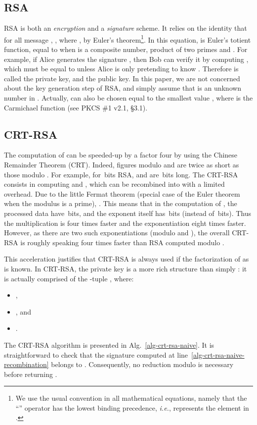 \documentclass[10pt]{article}
\theoremstyle{definition}
\theoremstyle{theorem}
\newcommand{\ie}{\textit{i.e.}}
\begin{document}
\subsection{RSA}

RSA is both an \emph{encryption} and a \emph{signature} scheme.
It relies on the identity that for all message ,
, where , by Euler's theorem\footnote{We use the usual convention in all mathematical equations, namely that the ``'' operator has the lowest binding precedence,
\ie,  represents the element  in .}.
In this equation,  is Euler's totient function, equal to  when  is a composite number, product of two primes  and .
For example, if Alice generates the signature ,
then Bob can verify it by computing , which must be equal to  unless Alice is only pretending to know .
Therefore  is called the private key, and  the public key.
In this paper, we are not concerned about the key generation step of RSA,
and simply assume that  is an unknown number in .
Actually,  can also be chosen equal to the smallest value ,
where  is the Carmichael function (see PKCS \#1 v2.1, \S 3.1).


\subsection{CRT-RSA}

The computation of  can be speeded-up by a factor four by using the Chinese Remainder Theorem (CRT).
Indeed, figures modulo  and  are twice as short as those modulo .
For example, for \,bits RSA,  and  are \,bits long.
The CRT-RSA consists in computing  and ,
which can be recombined into  with a limited overhead.
Due to the little Fermat theorem (special case of the Euler theorem when the modulus is a prime),
.
This means that in the computation of , the processed data have \,bits,
and the exponent itself has \,bits (instead of \,bits).
Thus the multiplication is four times faster and the exponentiation eight times faster.
However, as there are two such exponentiations (modulo  and ), the overall CRT-RSA is roughly speaking four times faster than RSA computed modulo .

This acceleration justifies that CRT-RSA is always used if the factorization of  as  is known.
In CRT-RSA, the private key is a more rich structure than simply :
it is actually comprised of the -tuple , where:
\begin{itemize}
\item ,
\item , and
\item .
\end{itemize}
The CRT-RSA algorithm is presented in Alg.~\ref{alg-crt-rsa-naive}.
It is straightforward to check that the signature computed at line~\ref{alg-crt-rsa-naive-recombination}
belongs to .
Consequently, no reduction modulo  is necessary before returning .
\end{document}

